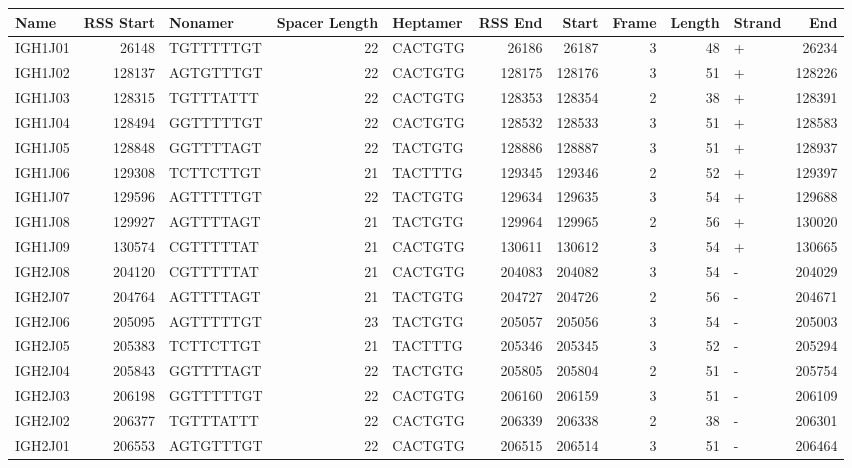 \begin{tabular}{lrlrlrrrrlr}
  \toprule Name & RSS Start & Nonamer & Spacer Length & Heptamer & RSS End & Start & Frame & Length & Strand & End \\ 
  \midrule IGH1J01 & 26148 & TGTTTTTGT & 22 & CACTGTG & 26186 & 26187 & 3 & 48 & + & 26234 \\ 
  IGH1J02 & 128137 & AGTGTTTGT & 22 & CACTGTG & 128175 & 128176 & 3 & 51 & + & 128226 \\ 
  IGH1J03 & 128315 & TGTTTATTT & 22 & CACTGTG & 128353 & 128354 & 2 & 38 & + & 128391 \\ 
  IGH1J04 & 128494 & GGTTTTTGT & 22 & CACTGTG & 128532 & 128533 & 3 & 51 & + & 128583 \\ 
  IGH1J05 & 128848 & GGTTTTAGT & 22 & TACTGTG & 128886 & 128887 & 3 & 51 & + & 128937 \\ 
  IGH1J06 & 129308 & TCTTCTTGT & 21 & TACTTTG & 129345 & 129346 & 2 & 52 & + & 129397 \\ 
  IGH1J07 & 129596 & AGTTTTTGT & 22 & TACTGTG & 129634 & 129635 & 3 & 54 & + & 129688 \\ 
  IGH1J08 & 129927 & AGTTTTAGT & 21 & TACTGTG & 129964 & 129965 & 2 & 56 & + & 130020 \\ 
  IGH1J09 & 130574 & CGTTTTTAT & 21 & CACTGTG & 130611 & 130612 & 3 & 54 & + & 130665 \\ 
  IGH2J08 & 204120 & CGTTTTTAT & 21 & CACTGTG & 204083 & 204082 & 3 & 54 & - & 204029 \\ 
  IGH2J07 & 204764 & AGTTTTAGT & 21 & TACTGTG & 204727 & 204726 & 2 & 56 & - & 204671 \\ 
  IGH2J06 & 205095 & AGTTTTTGT & 23 & TACTGTG & 205057 & 205056 & 3 & 54 & - & 205003 \\ 
  IGH2J05 & 205383 & TCTTCTTGT & 21 & TACTTTG & 205346 & 205345 & 3 & 52 & - & 205294 \\ 
  IGH2J04 & 205843 & GGTTTTAGT & 22 & TACTGTG & 205805 & 205804 & 2 & 51 & - & 205754 \\ 
  IGH2J03 & 206198 & GGTTTTTGT & 22 & CACTGTG & 206160 & 206159 & 3 & 51 & - & 206109 \\ 
  IGH2J02 & 206377 & TGTTTATTT & 22 & CACTGTG & 206339 & 206338 & 2 & 38 & - & 206301 \\ 
  IGH2J01 & 206553 & AGTGTTTGT & 22 & CACTGTG & 206515 & 206514 & 3 & 51 & - & 206464 \\ 
   \bottomrule \end{tabular}
